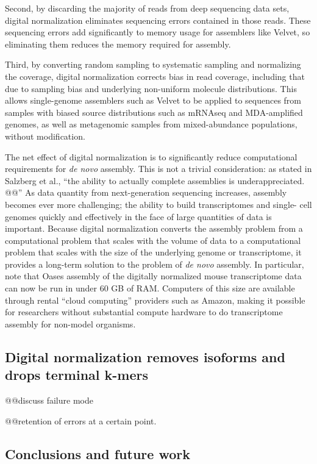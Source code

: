 \documentclass[10pt]{article}
\begin{document}
Second, by discarding the majority of reads from deep sequencing data sets, digital normalization eliminates
sequencing errors contained in those reads.  These sequencing errors add
significantly to memory usage for assemblers like Velvet, so
eliminating them reduces the memory required for assembly.

Third, by converting random sampling to systematic sampling and
normalizing the coverage, digital normalization corrects bias in read
coverage, including that due to sampling bias and underlying
non-uniform molecule distributions.  This allows single-genome
assemblers such as Velvet to be applied to sequences from samples with
biased source distributions such as mRNAseq and MDA-amplified genomes,
as well as metagenomic samples from mixed-abundance populations,
without modification.

The net effect of digital normalization is to significantly reduce
computational requirements for {\em de novo} assembly.  This is not a
trivial consideration: as stated in Salzberg et al., ``the ability to
actually complete assemblies is underappreciated. @@'' As data
quantity from next-generation sequencing increases, assembly becomes
ever more challenging; the ability to build transcriptomes and single-
cell genomes quickly and effectively in the face of large quantities
of data is important.  Because digital normalization converts the
assembly problem from a computational problem that scales with the
volume of data to a computational problem that scales with the size of
the underlying genome or transcriptome, it provides a long-term
solution to the problem of {\em de novo} assembly.  In particular,
note that Oases assembly of the digitally normalized mouse
transcriptome data can now be run in under 60 GB of RAM.  Computers
of this size are available through rental ``cloud computing'' providers
such as Amazon, making it possible for researchers without substantial
compute hardware to do transcriptome assembly for non-model organisms.

\subsection*{Digital normalization removes isoforms and drops terminal k-mers}

@@discuss failure mode

@@retention of errors at a certain point.

\subsection*{Conclusions and future work}
\end{document}
